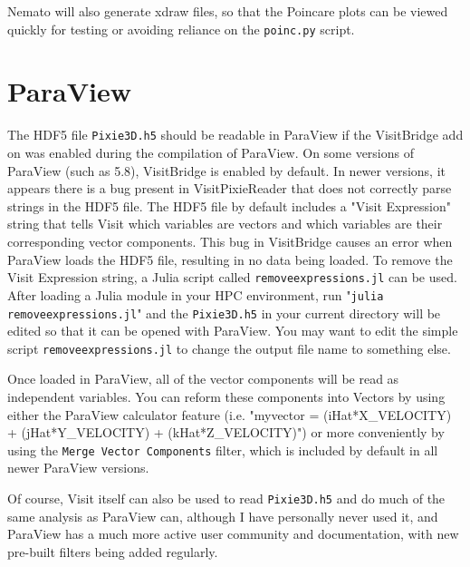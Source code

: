 \documentclass[12pt]{article}
\begin{document}
Nemato will also generate xdraw files, so that the Poincare plots can be viewed quickly for testing or avoiding reliance on the \texttt{poinc.py} script.

\section*{ParaView}
The HDF5 file \texttt{Pixie3D.h5} should be readable in ParaView if the VisitBridge add on was enabled during the compilation of ParaView.
On some versions of ParaView (such as 5.8), VisitBridge is enabled by default.
In newer versions, it appears there is a bug present in VisitPixieReader that does not correctly parse strings in the HDF5 file.
The HDF5 file by default includes a "Visit Expression" string that tells Visit which variables are vectors and which variables are their corresponding vector components.
This bug in VisitBridge causes an error when ParaView loads the HDF5 file, resulting in no data being loaded.
To remove the Visit Expression string, a Julia script called \texttt{removeexpressions.jl} can be used.
After loading a Julia module in your HPC environment, run "\texttt{julia removeexpressions.jl}" and the \texttt{Pixie3D.h5} in your current directory will be edited so that it can be opened with ParaView.
You may want to edit the simple script \texttt{removeexpressions.jl} to change the output file name to something else.

Once loaded in ParaView, all of the vector components will be read as independent variables.
You can reform these components into Vectors by using either the ParaView calculator feature (i.e. "myvector = (iHat*X\_VELOCITY) + (jHat*Y\_VELOCITY) + (kHat*Z\_VELOCITY)") or more conveniently by using the \texttt{Merge Vector Components} filter, which is included by default in all newer ParaView versions.

Of course, Visit itself can also be used to read \texttt{Pixie3D.h5} and do much of the same analysis as ParaView can, although I have personally never used it, and ParaView has a much more active user community and documentation, with new pre-built filters being added regularly.
\end{document}
